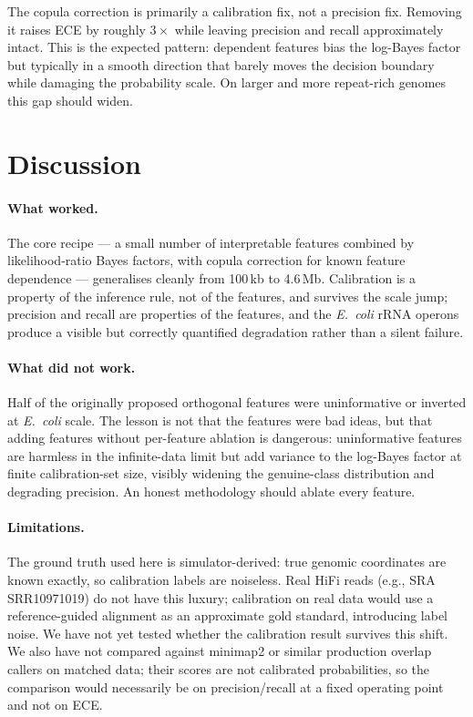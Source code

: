 \documentclass[11pt]{article}
\begin{document}
The copula correction is primarily a calibration fix, not a precision fix.
Removing it raises ECE by roughly $3\times$ while leaving precision and
recall approximately intact. This is the expected pattern: dependent
features bias the log-Bayes factor but typically in a smooth direction
that barely moves the decision boundary while damaging the probability
scale. On larger and more repeat-rich genomes this gap should widen.

\section{Discussion}
\label{sec:discussion}

\paragraph{What worked.}
The core recipe --- a small number of interpretable features combined by
likelihood-ratio Bayes factors, with copula correction for known feature
dependence --- generalises cleanly from 100\,kb to 4.6\,Mb. Calibration is
a property of the inference rule, not of the features, and survives the
scale jump; precision and recall are properties of the features, and the
\textit{E.\ coli} rRNA operons produce a visible but correctly quantified
degradation rather than a silent failure.

\paragraph{What did not work.}
Half of the originally proposed orthogonal features were uninformative or
inverted at \textit{E.\ coli} scale. The lesson is not that the features
were bad ideas, but that adding features without per-feature ablation is
dangerous: uninformative features are harmless in the infinite-data limit
but add variance to the log-Bayes factor at finite calibration-set size,
visibly widening the genuine-class distribution and degrading precision.
An honest methodology should ablate every feature.

\paragraph{Limitations.}
The ground truth used here is simulator-derived: true genomic coordinates
are known exactly, so calibration labels are noiseless. Real HiFi reads
(e.g., SRA SRR10971019) do not have this luxury; calibration on real data
would use a reference-guided alignment as an approximate gold standard,
introducing label noise. We have not yet tested whether the calibration
result survives this shift. We also have not compared against minimap2
\citep{li2016minimap} or similar production overlap callers on matched
data; their scores are not calibrated probabilities, so the comparison
would necessarily be on precision/recall at a fixed operating point and
not on ECE.
\end{document}
